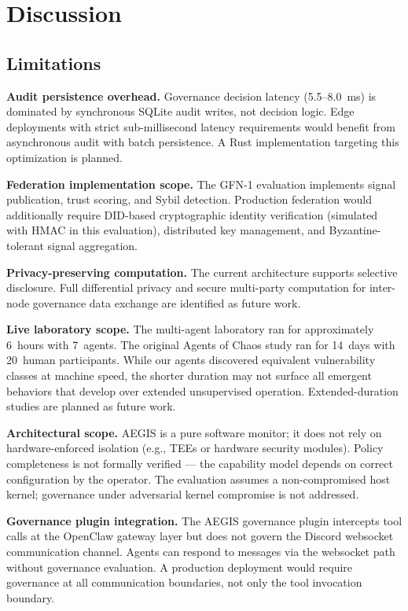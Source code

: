 \documentclass[journal]{IEEEtran}
\begin{document}
\section{Discussion}

\subsection{Limitations}

\textbf{Audit persistence overhead.} Governance decision latency (5.5--8.0~ms) is dominated by synchronous SQLite audit writes, not decision logic. Edge deployments with strict sub-millisecond latency requirements would benefit from asynchronous audit with batch persistence. A Rust implementation targeting this optimization is planned.

\textbf{Federation implementation scope.} The GFN-1 evaluation implements signal publication, trust scoring, and Sybil detection. Production federation would additionally require DID-based cryptographic identity verification (simulated with HMAC in this evaluation), distributed key management, and Byzantine-tolerant signal aggregation.

\textbf{Privacy-preserving computation.} The current architecture supports selective disclosure. Full differential privacy and secure multi-party computation for inter-node governance data exchange are identified as future work.

\textbf{Live laboratory scope.} The multi-agent laboratory ran for approximately 6~hours with 7~agents. The original Agents of Chaos study ran for 14~days with 20~human participants. While our agents discovered equivalent vulnerability classes at machine speed, the shorter duration may not surface all emergent behaviors that develop over extended unsupervised operation. Extended-duration studies are planned as future work.

\textbf{Architectural scope.} AEGIS is a pure software monitor; it does not rely on hardware-enforced isolation (e.g., TEEs or hardware security modules). Policy completeness is not formally verified --- the capability model depends on correct configuration by the operator. The evaluation assumes a non-compromised host kernel; governance under adversarial kernel compromise is not addressed.

\textbf{Governance plugin integration.} The AEGIS governance plugin intercepts tool calls at the OpenClaw gateway layer but does not govern the Discord websocket communication channel. Agents can respond to messages via the websocket path without governance evaluation. A production deployment would require governance at all communication boundaries, not only the tool invocation boundary.
\end{document}
